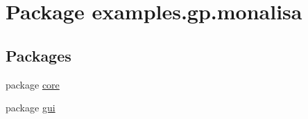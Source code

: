 \hypertarget{namespaceexamples_1_1gp_1_1monalisa}{\section{Package examples.\-gp.\-monalisa}
\label{namespaceexamples_1_1gp_1_1monalisa}
}
\subsection*{Packages}
\begin{DoxyCompactItemize}
\item 
package \hyperlink{namespaceexamples_1_1gp_1_1monalisa_1_1core}{core}
\item 
package \hyperlink{namespaceexamples_1_1gp_1_1monalisa_1_1gui}{gui}
\end{DoxyCompactItemize}
